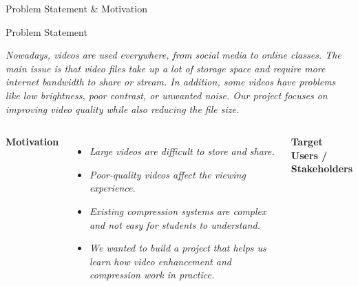 \documentclass[aspectratio=169,11pt]{beamer}
\newcommand{\placeholder}[1]{\textit{\color{GEUGrey}#1}}
\begin{document}
\begin{frame}{Problem Statement \& Motivation}

\begin{block}{Problem Statement}

\footnotesize

\placeholder{
Nowadays, videos are used everywhere, from social media to online classes.
The main issue is that video files take up a lot of storage space and require
more internet bandwidth to share or stream. In addition, some videos have
problems like low brightness, poor contrast, or unwanted noise. Our project
focuses on improving video quality while also reducing the file size.
}

\end{block}

\vspace{-2mm}

\begin{columns}[T,totalwidth=\textwidth]


{\footnotesize
\textbf{\color{GEUBlue}Motivation}
}

\vspace{0.2mm}

\begin{itemize}

\setlength{\itemsep}{0pt}
\setlength{\parskip}{0pt}

\footnotesize

\item
\placeholder{
Large videos are difficult to store and share.
}

\item
\placeholder{
Poor-quality videos affect the viewing experience.
}

\item
\placeholder{
Existing compression systems are complex and not easy for students to understand.
}

\item
\placeholder{
We wanted to build a project that helps us learn how video enhancement
and compression work in practice.
}

\end{itemize}



{\footnotesize
\textbf{\color{GEUBlue}Target Users / Stakeholders}
}

\vspace{0.2mm}


\end{columns}
\end{frame}
\end{document}

